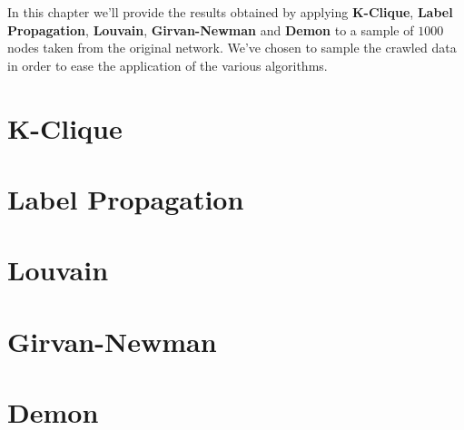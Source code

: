 In this chapter we'll provide the results obtained by applying \textbf{K-Clique}, \textbf{Label Propagation},
\textbf{Louvain}, \textbf{Girvan-Newman} and \textbf{Demon} to a sample of $1000$ nodes taken from the original
network. We've chosen to sample the crawled data in order to ease the application of the various algorithms.
\section{K-Clique} %
\label{sec:k_clique}


\section{Label Propagation} %
\label{sec:label_propagation}


\section{Louvain} %
\label{sec:louvain}


\section{Girvan-Newman} %
\label{sec:girvan_newman}


\section{Demon} %
\label{sec:demon}

